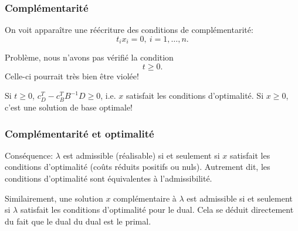 \documentclass[usepdftitle=false]{beamer}
\begin{document}
\begin{frame}
\frametitle{Complémentarité}

On voit apparaître une réécriture des conditions de complémentarité:
\[
t_i x_i = 0,\ i = 1,\ldots,n.
\]

\mbox{}

Problème, nous n'avons pas vérifié la condition
$$
t \geq 0.
$$
Celle-ci pourrait très bien être violée!

\mbox{}

Si $t \geq 0$, $c_D^T - c_B^TB^{-1}D \geq 0$, i.e. $x$ satisfait les conditions d'optimalité. Si $x \geq 0$, c'est une solution de base optimale!

\end{frame}

\begin{frame}
\frametitle{Complémentarité et optimalité}

Conséquence: $\lambda$ est admissible (réalisable) si et seulement si $x$ satisfait les conditions d'optimalité (coûts réduits positifs ou nuls).
Autrement dit, les conditions d'optimalité sont équivalentes à l'admissibilité.

\mbox{}

Similairement, une solution $x$ complémentaire à $\lambda$ est admissible si et seulement si $\lambda$ satisfait les conditions d’optimalité pour le dual. Cela se déduit directement du fait que le dual du dual est le primal.
 
\end{frame}
\end{document}

